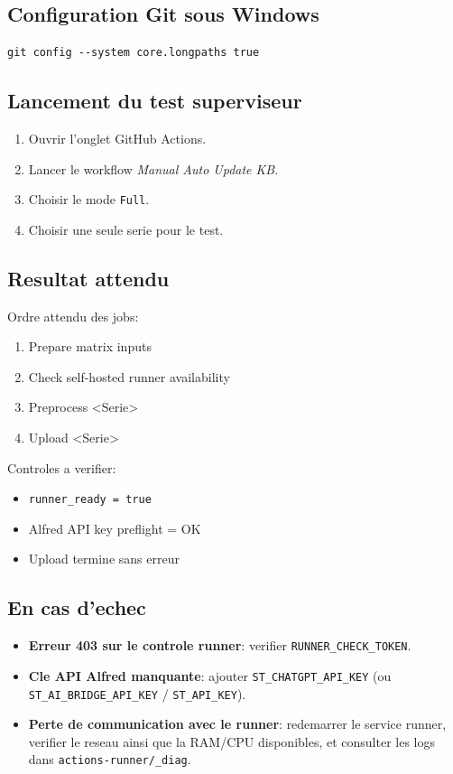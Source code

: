 \documentclass[11pt,a4paper]{article}
\begin{document}
\subsection{Configuration Git sous Windows}
\begin{lstlisting}[style=cmd]
git config --system core.longpaths true
\end{lstlisting}

\subsection{Lancement du test superviseur}
\begin{enumerate}[leftmargin=*]
  \item Ouvrir l'onglet GitHub Actions.
  \item Lancer le workflow \emph{Manual Auto Update KB}.
  \item Choisir le mode \texttt{Full}.
  \item Choisir une seule serie pour le test.
\end{enumerate}

\subsection{Resultat attendu}
Ordre attendu des jobs:
\begin{enumerate}[leftmargin=*]
  \item Prepare matrix inputs
  \item Check self-hosted runner availability
  \item Preprocess <Serie>
  \item Upload <Serie>
\end{enumerate}
Controles a verifier:
\begin{itemize}[leftmargin=*]
  \item \texttt{runner\_ready = true}
  \item Alfred API key preflight = OK
  \item Upload termine sans erreur
\end{itemize}

\subsection{En cas d'echec}
\begin{itemize}[leftmargin=*]
  \item \textbf{Erreur 403 sur le controle runner}: verifier \texttt{RUNNER\_CHECK\_TOKEN}.
  \item \textbf{Cle API Alfred manquante}: ajouter \texttt{ST\_CHATGPT\_API\_KEY}
  (ou \texttt{ST\_AI\_BRIDGE\_API\_KEY} / \texttt{ST\_API\_KEY}).
  \item \textbf{Perte de communication avec le runner}: redemarrer le service runner,
  verifier le reseau ainsi que la RAM/CPU disponibles, et consulter les logs dans
  \texttt{actions-runner/\_diag}.
\end{itemize}
\end{document}
